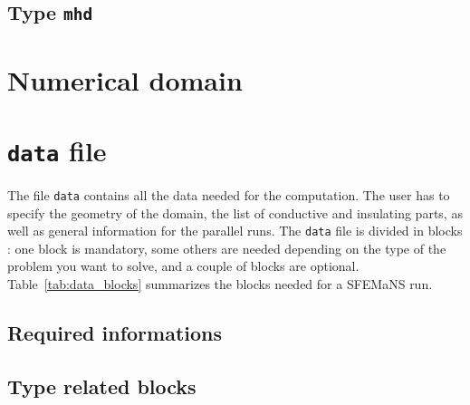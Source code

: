 \documentclass[a4paper]{book}
\begin{document}
\subsection{Type \texttt{mhd}}
\section{Numerical domain}
\section{\texttt{data} file}
The file \texttt{data} contains all the data needed for the computation. The user has to specify the geometry of the domain, the list of conductive and insulating parts, as well as general information for the parallel runs. The \texttt{data} file is divided in blocks : one block is mandatory, some others are needed depending on the type of the problem you want to solve, and a couple of blocks are optional. Table~\ref{tab:data_blocks} summarizes the blocks needed for a SFEMaNS run.
\subsection{Required informations}
\subsection{Type related blocks}
\end{document}
